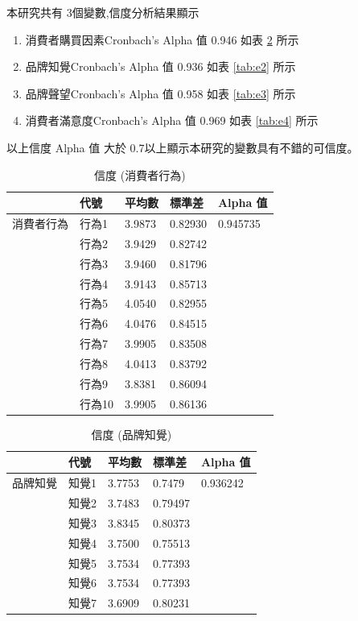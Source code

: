 本研究共有 3個變數,信度分析結果顯示
\begin{enumerate}
\item 消費者購買因素Cronbach's Alpha 值 0.946  如表 \ref{tab:e1}  所示
\item 品牌知覺Cronbach's Alpha 值 0.936  如表 \ref{tab:e2}  所示
\item 品牌聲望Cronbach's Alpha 值  0.958 如表 \ref{tab:e3}  所示
\item 消費者滿意度Cronbach's Alpha 值 0.969 如表 \ref{tab:e4}  所示
\end{enumerate}
以上信度 Alpha 值 大於 0.7以上顯示本研究的變數具有不錯的可信度。

\begin{table}[htb]
\caption{信度 (消費者行為)}
\label{tab:e1}
\renewcommand{\arraystretch}{1.2} %
\arrayrulewidth=1pt               %
\tabcolsep=18pt                   %
\begin{tabular}[t]{lllll}  %
\hline
  & 代號& 平均數 & 標準差&  Alpha 值  \\
\hline
消費者行為&行為1&3.9873&0.82930&0.945735\\
               &行為2&3.9429	&0.82742&\\	
               &行為3&3.9460&0.81796&\\
               &行為4&3.9143&0.85713&\\
               &行為5&4.0540&0.82955&\\
               &行為6&4.0476&0.84515&\\
               &行為7&3.9905&0.83508&\\
               &行為8&4.0413&0.83792&\\
               &行為9&3.8381&0.86094&\\
               &行為10&3.9905&0.86136&\\
\hline
\end{tabular}
\end{table}

\begin{table}[htb]
\caption{信度 (品牌知覺)}
\label{tab:e1}
\renewcommand{\arraystretch}{1.2} %
\arrayrulewidth=1pt               %
\tabcolsep=18pt                   %
\begin{tabular}[t]{lllll}  %
\hline
 & 代號& 平均數 & 標準差&  Alpha 值  \\
\hline
品牌知覺 & 知覺1  & 3.7753   & 0.7479  &0.936242 \\
              & 知覺2  & 3.7483  &0.79497  &  \\
             & 知覺3  & 3.8345    & 0.80373  &  \\
             & 知覺4 & 3.7500   &0.75513  &\\
             & 知覺5   & 3.7534  & 0.77393 &  \\
             & 知覺6  & 3.7534    &  0.77393 & \\
             & 知覺7  & 3.6909     & 0.80231  &  \\
\hline
\end{tabular}
\end{table}



